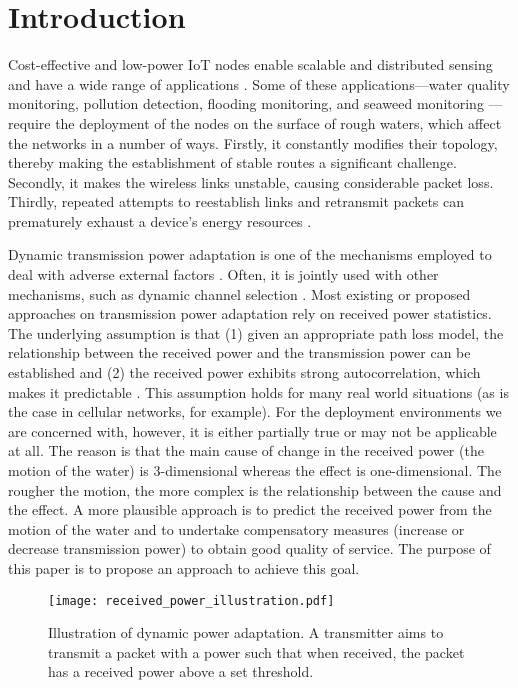 \section{Introduction}
\label{intro}

Cost-effective and low-power IoT nodes enable scalable and distributed sensing and have a wide range of applications \cite{lombardo2017wireless, zhao2024missing}. Some of these applications---water quality monitoring, pollution detection, flooding monitoring, and seaweed monitoring --- require the deployment of the nodes on the surface of rough waters, which affect the networks in a number of ways. Firstly, it constantly modifies their topology, thereby making the establishment of stable routes a significant challenge. Secondly, it makes the wireless links unstable, causing considerable packet loss. Thirdly, repeated attempts to reestablish links and retransmit packets can prematurely exhaust a device's energy resources \cite{gong2021self}. 

Dynamic transmission power adaptation is one of the mechanisms employed to deal with adverse external factors \cite{lin2016atpc, jurdak2007adaptive, dargie2011dynamic}. Often, it is jointly used with other mechanisms, such as dynamic channel selection \cite{watteyne2009reliability}. 
Most existing or proposed approaches on transmission power adaptation rely on received power statistics. The underlying assumption is that (1) given an appropriate path loss model, the relationship between the received power and the transmission power can be established and (2) the received power exhibits strong autocorrelation, which makes it predictable  \cite{govindan2011probability,alsamhi2021predictive}. This assumption holds for many real world situations (as is the case in cellular networks, for example). For the deployment environments we are concerned with, however, it is either partially true or may not be applicable at all. The reason is that the main cause of change in the received power (the motion of the water) is 3-dimensional whereas the effect is one-dimensional. The rougher the motion, the more complex is the relationship between the cause and the effect. A more plausible approach is to predict the received power from the motion of the water and to undertake compensatory measures (increase or decrease transmission power) to obtain good quality of service. The purpose of this paper is to propose an approach to achieve this goal. 

\begin{figure}
	\centering
		\texttt{[image: received\_power\_illustration.pdf]}
	\caption{Illustration of dynamic power adaptation. A transmitter aims to transmit a packet with a power such that when received, the packet has a received power above a set threshold.}
	\label{fig:received_power_illustration}
\end{figure}

